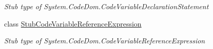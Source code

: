 \begin{DoxyCompactItemize}
\begin{DoxyCompactList}\small\item\em Stub type of System.\-Code\-Dom.\-Code\-Variable\-Declaration\-Statement\end{DoxyCompactList}\item 
class \hyperlink{class_system_1_1_code_dom_1_1_fakes_1_1_stub_code_variable_reference_expression}{Stub\-Code\-Variable\-Reference\-Expression}
\begin{DoxyCompactList}\small\item\em Stub type of System.\-Code\-Dom.\-Code\-Variable\-Reference\-Expression\end{DoxyCompactList}\end{DoxyCompactItemize}
